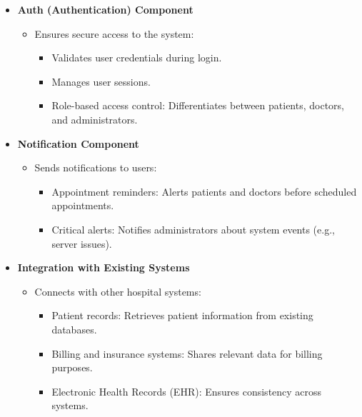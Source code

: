 \documentclass[a4paper, 12pt]{article}
\begin{document}
\begin{itemize}
    \item \textbf{Auth (Authentication) Component}
    \begin{itemize}
        \item Ensures secure access to the system:
        \begin{itemize}
            \item Validates user credentials during login.
            \item Manages user sessions.
            \item Role-based access control: Differentiates between patients, doctors, and administrators.
        \end{itemize}
    \end{itemize}
    
    \item \textbf{Notification Component}
    \begin{itemize}
        \item Sends notifications to users:
        \begin{itemize}
            \item Appointment reminders: Alerts patients and doctors before scheduled appointments.
            \item Critical alerts: Notifies administrators about system events (e.g., server issues).
        \end{itemize}
    \end{itemize}
    
    \item \textbf{Integration with Existing Systems}
    \begin{itemize}
        \item Connects with other hospital systems:
        \begin{itemize}
            \item Patient records: Retrieves patient information from existing databases.
            \item Billing and insurance systems: Shares relevant data for billing purposes.
            \item Electronic Health Records (EHR): Ensures consistency across systems.
        \end{itemize}
    \end{itemize}
\end{itemize}

\newpage
\end{document}
